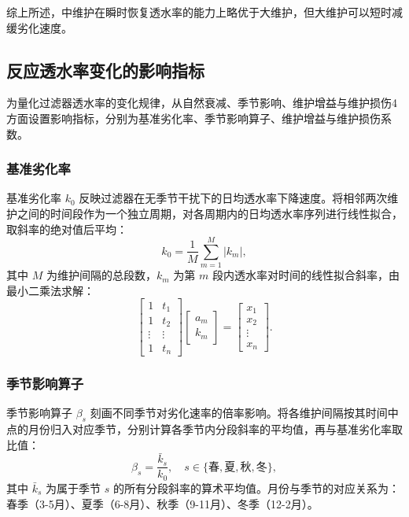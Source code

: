 \documentclass[withoutpreface,bwprint]{cumcmthesis}
\begin{document}
综上所述，中维护在瞬时恢复透水率的能力上略优于大维护，但大维护可以短时减缓劣化速度。



\subsection{反应透水率变化的影响指标}\label{sec:指标}

为量化过滤器透水率的变化规律，从自然衰减、季节影响、维护增益与维护损伤4方面设置影响指标，分别为基准劣化率、季节影响算子、维护增益与维护损伤系数。

\subsubsection{基准劣化率}

基准劣化率 $k_0$ 反映过滤器在无季节干扰下的日均透水率下降速度。将相邻两次维护之间的时间段作为一个独立周期，对各周期内的日均透水率序列进行线性拟合，取斜率的绝对值后平均：
\begin{equation}
	k_0 = \frac{1}{M} \sum_{m=1}^{M} |k_m|,
	\label{eq:回忆开始}
\end{equation}
其中 $M$ 为维护间隔的总段数，$k_m$ 为第 $m$ 段内透水率对时间的线性拟合斜率，由最小二乘法求解：
\[
	\begin{bmatrix}
		1 & t_1 \\
		1 & t_2 \\
		\vdots & \vdots \\
		1 & t_n
	\end{bmatrix}
	\begin{bmatrix}
		a_m \\
		k_m
	\end{bmatrix}
	= \begin{bmatrix}
		x_1 \\ x_2 \\ \vdots \\ x_n
	\end{bmatrix}.
\]

\subsubsection{季节影响算子}

季节影响算子 $\beta_s$ 刻画不同季节对劣化速率的倍率影响。将各维护间隔按其时间中点的月份归入对应季节，分别计算各季节内分段斜率的平均值，再与基准劣化率取比值：
\begin{equation}
	\beta_s = \frac{\bar{k}_s}{k_0}, \quad s \in \{\text{春},\text{夏},\text{秋},\text{冬}\},
\end{equation}
其中 $\bar{k}_s$ 为属于季节 $s$ 的所有分段斜率的算术平均值。月份与季节的对应关系为：春季（3-5月）、夏季（6-8月）、秋季（9-11月）、冬季（12-2月）。
\end{document}
